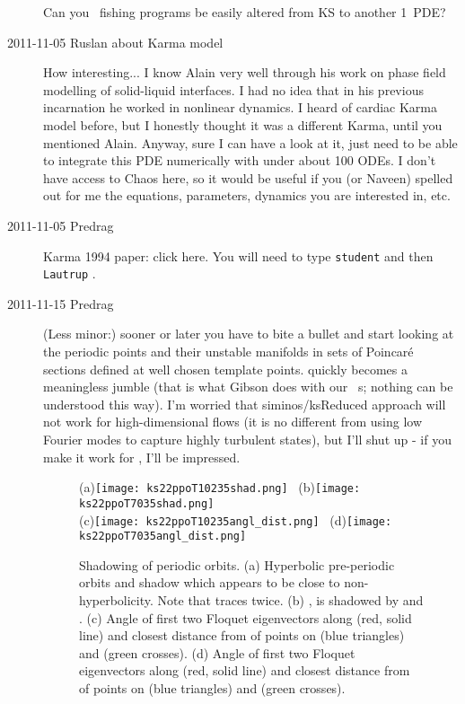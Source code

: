 \begin{description}
Can you \rpo\ fishing programs be easily altered from KS to another
1\dmn\ PDE?

\item[2011-11-05 Ruslan about Karma model]  How interesting... I know
Alain very well through his work on phase field modelling of solid-liquid
interfaces.  I had no idea that in his previous incarnation he worked in
nonlinear dynamics.  I heard of cardiac Karma model before, but I
honestly thought it was a different Karma, until you mentioned Alain.
Anyway, sure I can have a look at it, just need to be able to integrate
this PDE numerically with under about 100 ODEs.  I don't have access to
Chaos here, so it would be useful if you (or Naveen) spelled out for me
the equations, parameters, dynamics you are interested in, etc.

\item[2011-11-05 Predrag] Karma 1994 paper:
{click here}. You will need to type \texttt{student} and then \texttt{Lautrup} .

\item[2011-11-15 Predrag] (Less minor:) sooner or later you have to bite
a bullet and start looking at the periodic points and their unstable
manifolds in sets of Poincar\'e sections defined at well chosen template
points.  quickly becomes a meaningless jumble (that
is what Gibson does with our \pCf\ \po s; nothing can be
understood this way). I'm worried that siminos/ksReduced
approach will not work for high-dimensional flows (it is no different
from using low Fourier modes to capture highly turbulent states), but
I'll shut up - if you make it work for \KS, I'll be impressed.

\begin{figure}[ht]
  \begin{center}
    (a)\texttt{[image: ks22ppoT10235shad.png]}~
    (b)\texttt{[image: ks22ppoT7035shad.png]}\\
    (c)\texttt{[image: ks22ppoT10235angl\_dist.png]}~
    (d)\texttt{[image: ks22ppoT7035angl\_dist.png]}
  \end{center}
  \caption{Shadowing of periodic orbits. (a) Hyperbolic pre-periodic orbits
     and  shadow  which appears to be close
    to non-hyperbolicity. Note that  traces  twice.
    (b) , is shadowed by  and .
    (c) Angle of first two Floquet eigenvectors along  (red, solid line) and
    closest distance from  of points on  (blue triangles) and 
    (green crosses). (d) Angle of first two Floquet eigenvectors along  (red, solid line) and
    closest distance from  of points on  (blue triangles) and 
    (green crosses).
    }
  \label{fig:ks22shad}
\end{figure}



\end{description}
